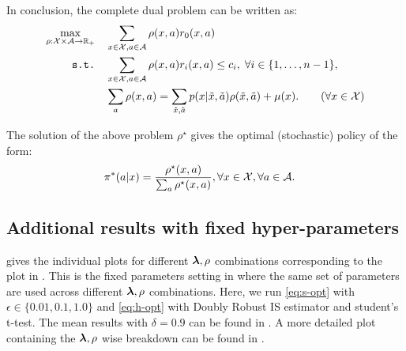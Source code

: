 In conclusion, the complete dual problem can be written as:
\begin{align}
    \label{eq:cmdp-opt}
    \max_{\rho: \X \times \A \rightarrow \mathbb{R}_{+}}  &\quad \sum_{x \in \X, a \in \A} \rho(x,a) r_0(x,a) \\  
    \texttt{s.t.}  &\quad \sum_{x \in \X, a \in \A} \rho(x,a) r_i(x,a) \leq c_i,  \; \forall i \in \{1,\dots,n-1\}, \nonumber \\
    &\quad \sum_{a} \rho(x,a) = \sum_{\tilde{x},\tilde{a}} p(x|\tilde{x},\tilde{a}) \rho(\tilde{x},\tilde{a}) + \mu(x). \tag{$\forall x \in \X$}
\end{align}


The solution of the above problem $\rho^{\star}$ gives the optimal (stochastic) policy of the form:
\begin{align*}
    \pi^{*}(a|x) &= \frac{\rho^{\star}(x,a)}{\sum_a \rho^{\star}(x,a)} , \forall x \in \mathcal{X}, \forall a \in \mathcal{A}. 
\end{align*}


\subsection{Additional results with fixed hyper-parameters}
\label{app:cmdp-fixed-param-results}

 gives the individual plots for different $\bm{\lambda}, \rho$ combinations corresponding to the plot in . This is the fixed parameters setting in  where the same set of parameters are used across different $\bm{\lambda}, \rho$ combinations. Here, we run \ref{eq:s-opt} with $\epsilon \in \{0.01, 0.1, 1.0\}$ and \ref{eq:h-opt} with Doubly Robust IS estimator \citep{jiang2015doubly} and student's t-test.  
The mean results with $\delta=0.9$ can be found in . A more detailed plot containing the $\bm{\lambda}, \rho$ wise breakdown can be found in .


